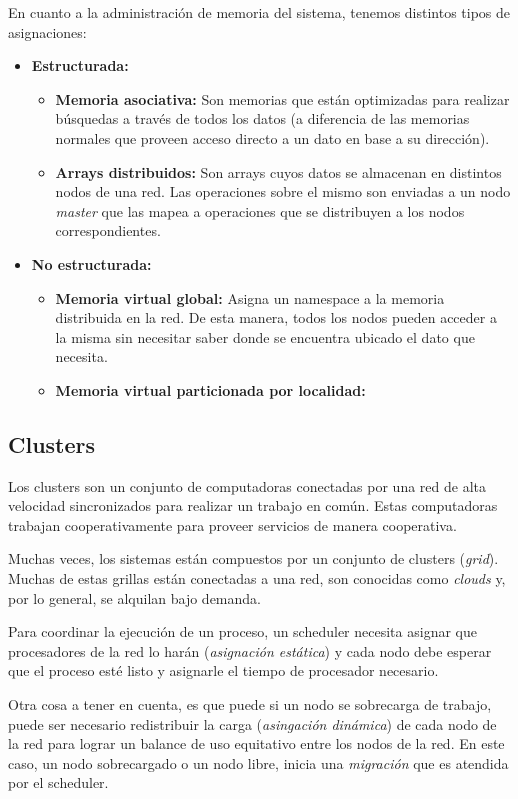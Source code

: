 En cuanto a la administración de memoria del sistema, tenemos	 distintos tipos de asignaciones:
\begin{itemize}
	\item \textbf{Estructurada:}
	\begin{itemize}
	\item \textbf{Memoria asociativa:} Son memorias que están optimizadas para realizar búsquedas a través de todos los datos (a diferencia de las memorias normales que proveen acceso directo a un dato en base a su dirección).
	\item\textbf{Arrays distribuidos:} Son arrays cuyos datos se almacenan en distintos nodos de una red. Las operaciones sobre el mismo son enviadas a un nodo \textit{master} que las mapea a operaciones que se distribuyen a los nodos correspondientes.
	\end{itemize}
	\item\textbf{No estructurada:}
	\begin{itemize}
		\item \textbf{Memoria virtual global:} Asigna un namespace a la memoria distribuida en la red. De esta manera, todos los nodos pueden acceder a la misma sin necesitar saber donde se encuentra ubicado el dato que necesita.
		\item\textbf{Memoria virtual particionada por localidad:} 
	\end{itemize}
\end{itemize}

\subsection{Clusters}

Los clusters son un conjunto de computadoras conectadas por una red de alta velocidad sincronizados para realizar un trabajo en común. Estas computadoras trabajan cooperativamente para proveer servicios de manera cooperativa.

Muchas veces, los sistemas están compuestos por un conjunto de clusters (\textit{grid}). Muchas de estas grillas están conectadas a una red, son conocidas como \textit{clouds} y, por lo general, se alquilan bajo demanda. 

Para coordinar la ejecución de un proceso, un scheduler necesita asignar que procesadores de la red lo harán (\textit{asignación estática}) y cada nodo debe esperar que el proceso esté listo y asignarle el tiempo de procesador necesario. 

Otra cosa a tener en cuenta, es que puede si un nodo se sobrecarga de trabajo, puede ser necesario redistribuir la carga (\textit{asingación dinámica}) de cada nodo de la red para lograr un balance de uso equitativo entre los nodos de la red. En este caso, un nodo sobrecargado o un nodo libre, inicia una \textit{migración} que es atendida por el scheduler. 

